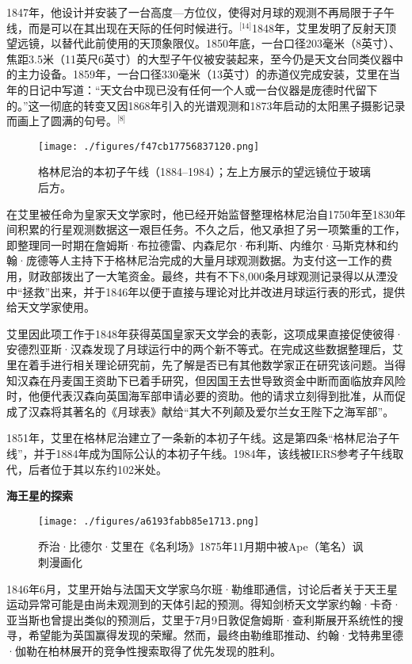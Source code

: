 1847年，他设计并安装了一台高度—方位仪，使得对月球的观测不再局限于子午线，而是可以在其出现在天际的任何时候进行。\(^\text{[14]}\)1848年，艾里发明了反射天顶望远镜，以替代此前使用的天顶象限仪。1850年底，一台口径203毫米（8英寸）、焦距3.5米（11英尺6英寸）的大型子午仪被安装起来，至今仍是天文台同类仪器中的主力设备。1859年，一台口径330毫米（13英寸）的赤道仪完成安装，艾里在当年的日记中写道：“天文台中现已没有任何一个人或一台仪器是庞德时代留下的。”这一彻底的转变又因1868年引入的光谱观测和1873年启动的太阳黑子摄影记录而画上了圆满的句号。\(^\text{[8]}\)
\begin{figure}[ht]
\centering
\texttt{[image: ./figures/f47cb17756837120.png]}
\caption{格林尼治的本初子午线（1884–1984）；左上方展示的望远镜位于玻璃后方。} \label{fig_AL_5}
\end{figure}
在艾里被任命为皇家天文学家时，他已经开始监督整理格林尼治自1750年至1830年间积累的行星观测数据这一艰巨任务。不久之后，他又承担了另一项繁重的工作，即整理同一时期在詹姆斯·布拉德雷、内森尼尔·布利斯、内维尔·马斯克林和约翰·庞德等人主持下于格林尼治完成的大量月球观测数据。为支付这一工作的费用，财政部拨出了一大笔资金。最终，共有不下8,000条月球观测记录得以从湮没中“拯救”出来，并于1846年以便于直接与理论对比并改进月球运行表的形式，提供给天文学家使用。

艾里因此项工作于1848年获得英国皇家天文学会的表彰，这项成果直接促使彼得·安德烈亚斯·汉森发现了月球运行中的两个新不等式。在完成这些数据整理后，艾里在着手进行相关理论研究前，先了解是否已有其他数学家正在研究该问题。当得知汉森在丹麦国王资助下已着手研究，但因国王去世导致资金中断而面临放弃风险时，他便代表汉森向英国海军部申请必要的资助。他的请求立刻得到批准，从而促成了汉森将其著名的《月球表》献给“其大不列颠及爱尔兰女王陛下之海军部”。

1851年，艾里在格林尼治建立了一条新的本初子午线。这是第四条“格林尼治子午线”，并于1884年成为国际公认的本初子午线。1984年，该线被IERS参考子午线取代，后者位于其以东约102米处。

\textbf{海王星的探索}
\begin{figure}[ht]
\centering
\texttt{[image: ./figures/a6193fabb85e1713.png]}
\caption{乔治·比德尔·艾里在《名利场》1875年11月期中被Ape（笔名）讽刺漫画化} \label{fig_AL_6}
\end{figure}
1846年6月，艾里开始与法国天文学家乌尔班·勒维耶通信，讨论后者关于天王星运动异常可能是由尚未观测到的天体引起的预测。得知剑桥天文学家约翰·卡奇·亚当斯也曾提出类似的预测后，艾里于7月9日敦促詹姆斯·查利斯展开系统性的搜寻，希望能为英国赢得发现的荣耀。然而，最终由勒维耶推动、约翰·戈特弗里德·伽勒在柏林展开的竞争性搜索取得了优先发现的胜利。

